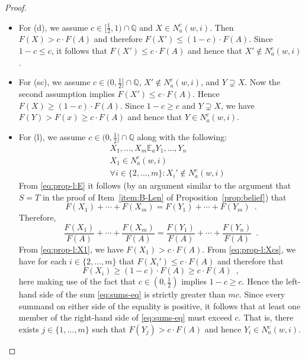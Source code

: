 \documentclass[12pt]{article}
\newcommand{\XXXcomment}[1]{}
\newcommand{\XXXcomment}[1]{\marginpar{\color{blue}{\footnotesize #1}}}
\theoremstyle{definition}
\newcommand{\Rat}{\mathbb{Q}}  %
\begin{document}
\begin{proof}
\begin{itemize}
  \item For (d), we assume $c\in[\frac 12,1)\cap\Rat$ and $X \in
    N^c_a(w,i)$. Then $F(X) > c\cdot F(A)$ and therefore $F(X') \leq
    (1-c)\cdot F(A)$. Since $1-c\leq c$, it follows that $F(X')\leq
    c\cdot F(A)$ and hence that $X' \notin N^c_a(w,i)$.

  \item For (sc), we assume $c\in(0,\frac 12]\cap\Rat$, $X'\notin
    N^c_a(w,i)$, and $Y\supsetneq X$.  Now the second assumption
    implies $F(X')\leq c\cdot F(A)$.  Hence $F(X)\geq(1-c)\cdot F(A)$.
    Since $1-c\geq c$ and $Y\supsetneq X$, we have $F(Y)>F(x)\geq
    c\cdot F(A)$ and hence that $Y\in N^c_a(w,i)$.

  \item For (l), we assume $c\in(0,\frac 12]\cap\Rat$ along with the
    following:
    \begin{eqnarray}
      &&
      X_1,\dots,X_m\mathbb{E}_aY_1,\dots,Y_n
      \label{eq:prop-l:E}
      \\
      &&
      X_1\in N^c_a(w,i) 
      \label{eq:prop-l:X1}
      \\
      &&
      \forall i\in\{2,\dots,m\}: X_i'\notin N^c_a(w,i)
      \label{eq:prop-l:Xcs}
    \end{eqnarray}
    From \eqref{eq:prop-l:E} it follows (by an argument similar to the
    argument that $S=T$ in the proof of Item~\ref{item:B-Len} of
    Proposition~\ref{prop:belief}) that \XXXcomment{If we drop the
      Segerberg argument in Prop.~\ref{prop:belief}, then we need to
      change the wording here.\hfill--br}
    \[
    F(X_1)+\cdots+F(X_m)=F(Y_1)+\cdots+F(Y_m)\enspace.
    \]
    Therefore,
    \begin{equation}
      \frac{F(X_1)}{F(A)}+\cdots+\frac{F(X_m)}{F(A)}=
      \frac{F(Y_1)}{F(A)}+\cdots+\frac{F(Y_n)}{F(A)}\enspace.
      \label{eq:sums-eq}
    \end{equation}
    From \eqref{eq:prop-l:X1}, we have $F(X_1)>c\cdot F(A)$.  From
    \eqref{eq:prop-l:Xcs}, we have for each $i\in\{2,\dots,m\}$ that
    $F(X_i')\leq c\cdot F(A)$ and therefore that
    \[
    F(X_i)\geq (1-c)\cdot F(A)\geq c\cdot F(A)\enspace,
    \]
    here making use of the fact that $c\in(0,\frac 12)$ implies
    $1-c\geq c$.  Hence the left-hand side of the sum
    \eqref{eq:sums-eq} is strictly greater than $mc$.  Since every
    summand on either side of the equality is positive, it follows
    that at least one member of the right-hand side of
    \eqref{eq:sums-eq} must exceed $c$.  That is, there exists
    $j\in\{1,\dots,m\}$ such that $F(Y_j)>c\cdot F(A)$ and hence
    $Y_i\in N^c_a(w,i)$.


\end{itemize}
\end{proof}
\end{document}
